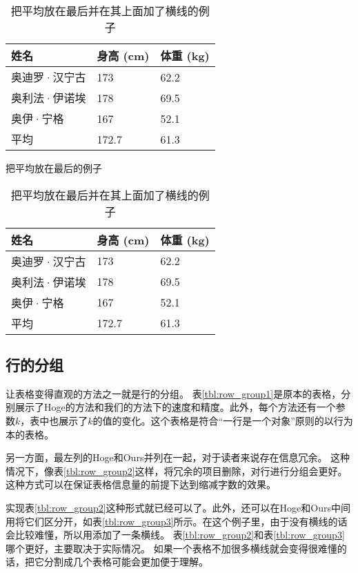 \documentclass{article}
\newcommand{\Tref}[1]{表\ref{#1}}
\begin{document}
\begin{table}[h]
    \begin{minipage}{0.48\linewidth}
        \centering
        \begin{tabular}{@{}lll@{}} \toprule
            姓名 & 身高 (cm) & 体重 (kg) \\ \midrule
            奥迪罗·汉宁古  & 173 & 62.2 \\ 
            奥利法·伊诺埃  & 178 & 69.5 \\ 
            奥伊·宁格      & 167 & 52.1 \\ 
            平均               & 172.7  & 61.3 \\ \bottomrule   
        \end{tabular}
        \caption{把平均放在最后的例子}
        \label{tbl:avg1}
    \end{minipage}
    \hfill
    \begin{minipage}{0.48\linewidth}
        \centering
        \begin{tabular}{@{}lll@{}} \toprule
            姓名 & 身高 (cm) & 体重 (kg) \\ \midrule
            奥迪罗·汉宁古  & 173 & 62.2 \\ 
            奥利法·伊诺埃  & 178 & 69.5 \\ 
            奥伊·宁格      & 167 & 52.1 \\ 
            \midrule
            平均               & 172.7  & 61.3 \\ \bottomrule   
        \end{tabular}
        \caption{把平均放在最后并在其上面加了横线的例子}
        \label{tbl:avg2}
    \end{minipage}
    \hfill
\end{table}


\subsection{行的分组}
让表格变得直观的方法之一就是行的分组。
\Tref{tbl:row_group1}是原本的表格，分别展示了Hoge的方法和我们的方法下的速度和精度。此外，每个方法还有一个参数$k$，表中也展示了$k$的值的变化。这个表格是符合“一行是一个对象”原则的以行为本的表格。

另一方面，最左列的Hoge和Ours并列在一起，对于读者来说存在信息冗余。
这种情况下，像\Tref{tbl:row_group2}这样，将冗余的项目删除，对行进行分组会更好。
这种方式可以在保证表格信息量的前提下达到缩减字数的效果。

实现\Tref{tbl:row_group2}这种形式就已经可以了。此外，还可以在Hoge和Ours中间用\texttt{\multirow}将它们区分开，如\Tref{tbl:row_group3}所示。在这个例子里，由于没有横线的话会比较难懂，所以用\texttt{\midrule}添加了一条横线。
\Tref{tbl:row_group2}和\Tref{tbl:row_group3}哪个更好，主要取决于实际情况。
如果一个表格不加很多横线就会变得很难懂的话，把它分割成几个表格可能会更加便于理解。
\end{document}
